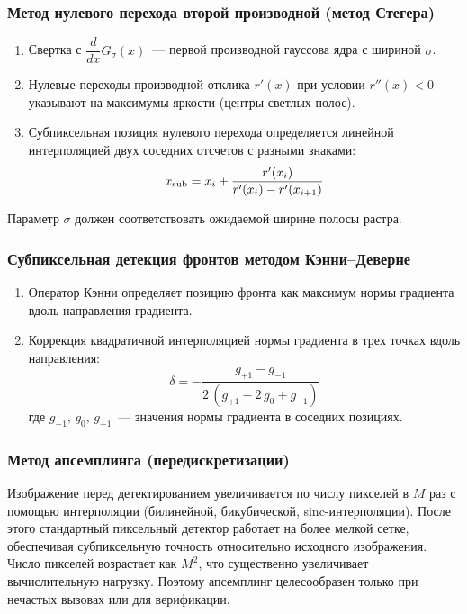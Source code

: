 \subsubsection{Метод нулевого перехода второй производной (метод Стегера) \cite{steger_subpixel}}

\begin{enumerate}
\item Свертка с $\dfrac{d}{dx}G_\sigma(x)$~--- первой производной гауссова ядра
с шириной $\sigma$.

\item Нулевые переходы производной отклика $r'(x)$ при условии $r''(x) < 0$ указывают
на максимумы яркости (центры светлых полос).

\item Субпиксельная позиция нулевого перехода определяется линейной
интерполяцией двух соседних отсчетов с разными знаками:
$$
x_{\rm sub} = x_i + \frac{r'(x_i)}{r'(x_i) - r'(x_{i+1})}
$$
\end{enumerate}

Параметр $\sigma$ должен соответствовать ожидаемой ширине полосы растра.

\subsubsection{Субпиксельная детекция фронтов методом Кэнни–Деверне \cite{gioi_canny_devernay}}

\begin{enumerate}
\item Оператор Кэнни определяет позицию фронта как максимум нормы градиента вдоль
направления градиента.

\item Коррекция квадратичной интерполяцией нормы градиента в трех точках вдоль направления:
$$
\delta = -\frac{g_{+1} - g_{-1}}{2\,(g_{+1} - 2\,g_0 + g_{-1})}
$$
где $g_{-1},\, g_0,\, g_{+1}$~--- значения нормы градиента в соседних позициях.
\end{enumerate}

\subsubsection{Метод апсемплинга (передискретизации) \cite{phase_matching_sampling}}

Изображение перед детектированием увеличивается по числу пикселей в $M$ раз
с помощью интерполяции (билинейной, бикубической, sinc-интерполяции). После этого
стандартный пиксельный детектор работает на более мелкой сетке, обеспечивая
субпиксельную точность относительно исходного изображения. Число пикселей возрастает
как $M^2$, что существенно увеличивает вычислительную нагрузку. Поэтому апсемплинг
целесообразен только при нечастых вызовах или для верификации.

